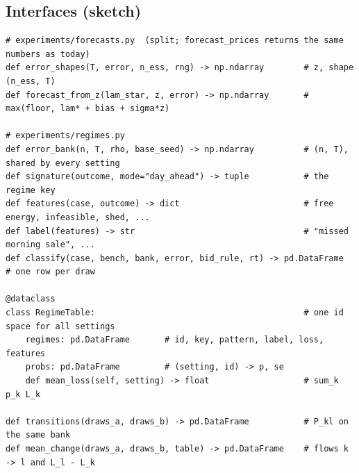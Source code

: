 \documentclass[10pt,a4paper]{article}
\begin{document}
\subsection{Interfaces (sketch)}
{\footnotesize
\begin{verbatim}
# experiments/forecasts.py  (split; forecast_prices returns the same numbers as today)
def error_shapes(T, error, n_ess, rng) -> np.ndarray        # z, shape (n_ess, T)
def forecast_from_z(lam_star, z, error) -> np.ndarray       # max(floor, lam* + bias + sigma*z)

# experiments/regimes.py
def error_bank(n, T, rho, base_seed) -> np.ndarray          # (n, T), shared by every setting
def signature(outcome, mode="day_ahead") -> tuple           # the regime key
def features(case, outcome) -> dict                         # free energy, infeasible, shed, ...
def label(features) -> str                                  # "missed morning sale", ...
def classify(case, bench, bank, error, bid_rule, rt) -> pd.DataFrame   # one row per draw

@dataclass
class RegimeTable:                                          # one id space for all settings
    regimes: pd.DataFrame       # id, key, pattern, label, loss, features
    probs: pd.DataFrame         # (setting, id) -> p, se
    def mean_loss(self, setting) -> float                   # sum_k p_k L_k

def transitions(draws_a, draws_b) -> pd.DataFrame           # P_kl on the same bank
def mean_change(draws_a, draws_b, table) -> pd.DataFrame    # flows k -> l and L_l - L_k
\end{verbatim}
}
\end{document}
